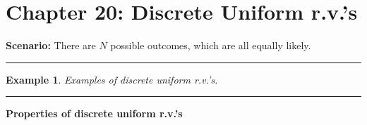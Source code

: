 \documentclass[12pt]{amsart}
\newtheorem{example}[theorem]{Example}
\begin{document}
\setcounter{section}{20}
{\huge  
\section*{Chapter 20: Discrete Uniform r.v.'s}
}

{\large 




\vspace{.5cm}

\textbf{Scenario:} There are $N$ possible outcomes, which are all equally likely.

\vspace{.5cm}
\hrule
\vspace{.5cm}

\begin{example}
Examples of discrete uniform r.v.'s.\end{example}




\vspace{8cm}
\hrule
\vspace{.5cm}

\textbf{Properties of discrete uniform r.v.'s}



}  %
\end{document}
